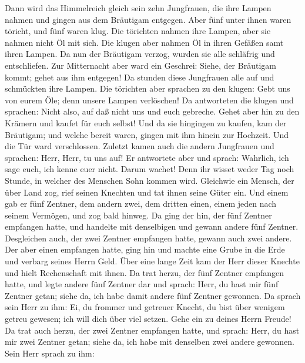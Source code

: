  Dann wird das Himmelreich gleich sein zehn Jungfrauen, die
ihre Lampen nahmen und gingen aus dem Bräutigam entgegen. 
Aber fünf unter ihnen waren töricht, und fünf waren klug. 
Die törichten nahmen ihre Lampen, aber sie nahmen nicht Öl mit sich.
 Die klugen aber nahmen Öl in ihren Gefäßen samt ihren
Lampen.  Da nun der Bräutigam verzog, wurden sie alle
schläfrig und entschliefen.  Zur Mitternacht aber ward ein
Geschrei: Siehe, der Bräutigam kommt; gehet aus ihm entgegen!
 Da stunden diese Jungfrauen alle auf und schmückten ihre
Lampen.  Die törichten aber sprachen zu den klugen: Gebt uns
von eurem Öle; denn unsere Lampen verlöschen!  Da
antworteten die klugen und sprachen: Nicht also, auf daß nicht uns und
euch gebreche. Gehet aber hin zu den Krämern und kaufet für euch selbst!
 Und da sie hingingen zu kaufen, kam der Bräutigam; und
welche bereit waren, gingen mit ihm hinein zur Hochzeit. Und die Tür
ward verschlossen.  Zuletzt kamen auch die andern
Jungfrauen und sprachen: Herr, Herr, tu uns auf!  Er
antwortete aber und sprach: Wahrlich, ich sage euch, ich kenne euer
nicht.  Darum wachet! Denn ihr wisset weder Tag noch
Stunde, in welcher des Menschen Sohn kommen wird. 
Gleichwie ein Mensch, der über Land zog, rief seinen Knechten und tat
ihnen seine Güter ein.  Und einem gab er fünf Zentner, dem
andern zwei, dem dritten einen, einem jeden nach seinem Vermögen, und
zog bald hinweg.  Da ging der hin, der fünf Zentner
empfangen hatte, und handelte mit denselbigen und gewann andere fünf
Zentner.  Desgleichen auch, der zwei Zentner empfangen
hatte, gewann auch zwei andere.  Der aber einen empfangen
hatte, ging hin und machte eine Grube in die Erde und verbarg seines
Herrn Geld.  Über eine lange Zeit kam der Herr dieser
Knechte und hielt Rechenschaft mit ihnen.  Da trat herzu,
der fünf Zentner empfangen hatte, und legte andere fünf Zentner dar und
sprach: Herr, du hast mir fünf Zentner getan; siehe da, ich habe damit
andere fünf Zentner gewonnen.  Da sprach sein Herr zu ihm:
Ei, du frommer und getreuer Knecht, du bist über wenigem getreu gewesen;
ich will dich über viel setzen. Gehe ein zu deines Herrn Freude!
 Da trat auch herzu, der zwei Zentner empfangen hatte, und
sprach: Herr, du hast mir zwei Zentner getan; siehe da, ich habe mit
denselben zwei andere gewonnen.  Sein Herr sprach zu ihm:

